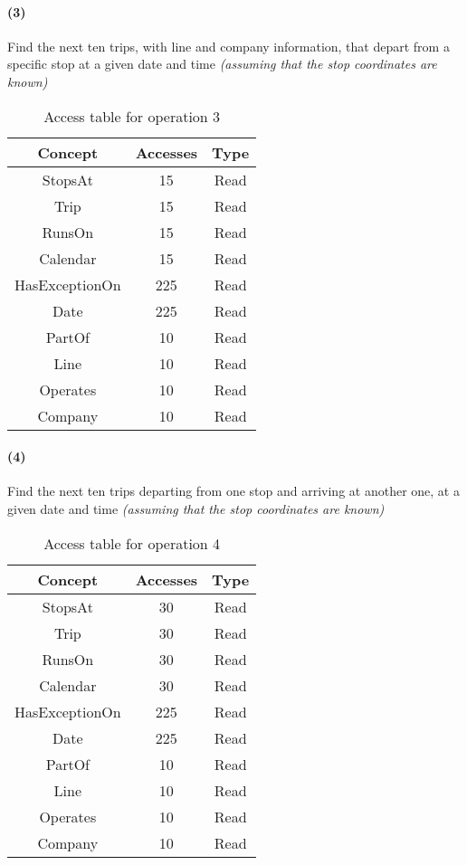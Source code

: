 	\paragraph{(3)} Find the next ten trips, with line and company information, that depart from a specific stop at a given date and time \textit{(assuming that the stop coordinates are known)}
	\begin{table}[h]
		\centering
		\begin{tabular}{|c|c|c|}
			\hline
			\textbf{Concept} & \textbf{Accesses} & \textbf{Type} \\
			\hline
			StopsAt & 15 & Read \\ \hline
			Trip & 15 & Read \\ \hline
			RunsOn & 15 & Read \\ \hline
			Calendar & 15 & Read \\ \hline
			HasExceptionOn & 225 & Read \\ \hline
			Date & 225 & Read \\ \hline
			PartOf & 10 & Read \\ \hline
			Line & 10 & Read \\ \hline
			Operates & 10 & Read \\ \hline
			Company & 10 & Read \\ \hline
		\end{tabular}
		\caption{Access table for operation 3}\label{tbl:conc.access-3}
	\end{table}
	
	\paragraph{(4)} Find the next ten trips departing from one stop and arriving at another one, at a given date and time \textit{(assuming that the stop coordinates are known)}
	
	\begin{table}[h]
		\centering
		\begin{tabular}{|c|c|c|}
			\hline
			\textbf{Concept} & \textbf{Accesses} & \textbf{Type} \\
			\hline
			StopsAt & 30 & Read \\ \hline
			Trip & 30 & Read \\ \hline
			RunsOn & 30 & Read \\ \hline
			Calendar & 30 & Read \\ \hline
			HasExceptionOn & 225 & Read \\ \hline
			Date & 225 & Read \\ \hline
			PartOf & 10 & Read \\ \hline
			Line & 10 & Read \\ \hline
			Operates & 10 & Read \\ \hline
			Company & 10 & Read \\ \hline
		\end{tabular}
		\caption{Access table for operation 4}\label{tbl:conc.access-4}
	\end{table}
	
